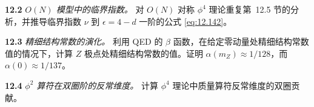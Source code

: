 \textbf{12.2} \emph{$O(N)$ 模型中的临界指数。} 对 $O(N)$ 对称 $\phi^4$ 理论重复第~12.5 节的分析，并推导临界指数 $\nu$ 到 $\epsilon = 4-d$ 一阶的公式 \eqref{eq:12.142}。

\textbf{12.3} \emph{精细结构常数的演化。} 利用 QED 的 $\beta$ 函数，在给定零动量处精细结构常数值的情况下，计算 $Z$ 极点处精细结构常数的值。证明 $\alpha(m_Z) \approx 1/128$，而 $\alpha(0) \approx 1/137$。

\textbf{12.4} \emph{$\phi^2$ 算符在双圈阶的反常维度。} 计算 $\phi^4$ 理论中质量算符反常维度的双圈贡献。
